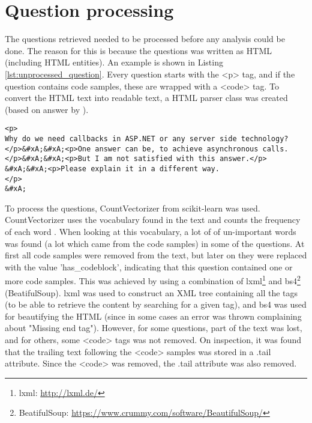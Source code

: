 \section{Question processing} 
\label{sec:question_processing}
The questions retrieved needed to be processed before any analysis could be done. 
The reason for this is because the questions was written as HTML (including HTML entities). 
An example is shown in Listing \ref{lst:unprocessed_question}. 
Every question starts with the <p> tag, and if the question contains code samples, these are wrapped with a <code> tag. 
To convert the HTML text into readable text, a HTML parser class was created (based on answer by \textcite{Eloff2009}).
\begin{lstlisting}[caption={Question before HTML is removed (Question ID: 941156)}, 
label={lst:unprocessed_question}, basicstyle=\small] 
<p>
Why do we need callbacks in ASP.NET or any server side technology?
</p>&#xA;&#xA;<p>One answer can be, to achieve asynchronous calls. 
</p>&#xA;&#xA;<p>But I am not satisfied with this answer.</p>
&#xA;&#xA;<p>Please explain it in a different way.
</p>
&#xA;
\end{lstlisting}
\noindent
To process the questions, CountVectorizer from scikit-learn was used. 
CountVectorizer uses the vocabulary found in the text and counts the frequency of each word \cite{Scikitlearn.org2016b} \cite[see~4.2.3]{Scikitlearn.org2016}. 
When looking at this vocabulary, a lot of of un-important words was found (a lot which came from the code samples) in some of the questions. 
At first all code samples were removed from the text, but later on they were replaced with the value 'has\_codeblock', indicating that this question contained one or more code samples. 
This was achieved by using a combination of lxml\footnote{lxml: \url{http://lxml.de/}} and bs4\footnote{BeatifulSoup: \url{https://www.crummy.com/software/BeautifulSoup/}} (BeatifulSoup). 
lxml was used to construct an XML tree containing all the tags (to be able to retrieve the content by searching for a given tag), and bs4 was used for beautifying the HTML 
(since in some cases an error was thrown complaining about "Missing end tag").
\vspace{0.5em}\newline
However, for some questions, part of the text was lost, and for others, some <code> tags was not removed. 
On inspection, it was found that the trailing text following the <code> samples was stored in a .tail attribute. 
Since the <code> was removed, the .tail attribute was also removed. 
